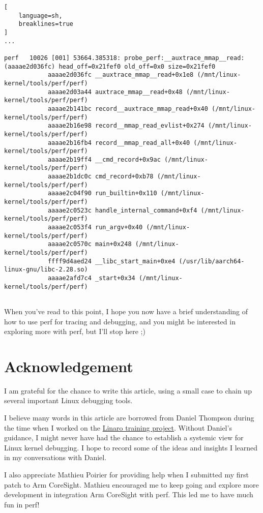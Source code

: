 \documentclass[11pt]{diazessay} %
\begin{document}
\begin{lstlisting}[
  	language=sh,
	breaklines=true
]
...

perf   10026 [001] 53664.385318: probe_perf:__auxtrace_mmap__read: (aaaae2d036fc) head_off=0x21fef0 old_off=0x0 size=0x21fef0
            aaaae2d036fc __auxtrace_mmap__read+0x1e8 (/mnt/linux-kernel/tools/perf/perf)
            aaaae2d03a44 auxtrace_mmap__read+0x48 (/mnt/linux-kernel/tools/perf/perf)
            aaaae2b141bc record__auxtrace_mmap_read+0x40 (/mnt/linux-kernel/tools/perf/perf)
            aaaae2b16e98 record__mmap_read_evlist+0x274 (/mnt/linux-kernel/tools/perf/perf)
            aaaae2b16fb4 record__mmap_read_all+0x40 (/mnt/linux-kernel/tools/perf/perf)
            aaaae2b19ff4 __cmd_record+0x9ac (/mnt/linux-kernel/tools/perf/perf)
            aaaae2b1dc0c cmd_record+0xb78 (/mnt/linux-kernel/tools/perf/perf)
            aaaae2c04f90 run_builtin+0x110 (/mnt/linux-kernel/tools/perf/perf)
            aaaae2c0523c handle_internal_command+0xf4 (/mnt/linux-kernel/tools/perf/perf)
            aaaae2c053f4 run_argv+0x40 (/mnt/linux-kernel/tools/perf/perf)
            aaaae2c0570c main+0x248 (/mnt/linux-kernel/tools/perf/perf)
            ffff9d4aed24 __libc_start_main+0xe4 (/usr/lib/aarch64-linux-gnu/libc-2.28.so)
            aaaae2afd7c4 _start+0x34 (/mnt/linux-kernel/tools/perf/perf)


\end{lstlisting}

When you've read to this point, I hope you now have a brief understanding
of how to use perf for tracing and debugging, and you might be interested
in exploring more with perf, but I'll stop here ;)

\section*{Acknowledgement}

I am grateful for the chance to write this article, using a small case to
chain up several important Linux debugging tools.

I believe many words in this article are borrowed from Daniel Thompson during
the time when I worked on the
\href{https://www.linaro.org/services/hands-on-training/}{Linaro training project}.
Without Daniel’s guidance, I might never have had the chance to establish a
systemic view for Linux kernel debugging. I hope to record some of the ideas and
insights I learned in my conversations with Daniel.

I also appreciate Mathieu Poirier for providing help when I submitted my first
patch to Arm CoreSight. Mathieu encouraged me to keep going and explore more
development in integration Arm CoreSight with perf. This led me to have much
fun in perf!
\end{document}
